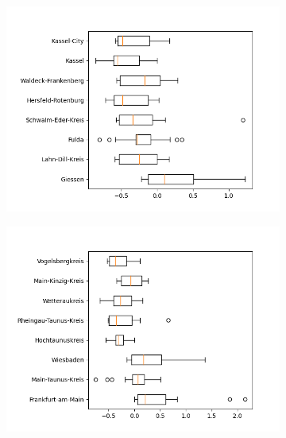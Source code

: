 \begin{figure}
	\centering
	\begin{subfigure}[b]{0.4\textwidth}
		\centering
		\includegraphics[width=\textwidth]{./figures/76d/deviation_box76_alt1.png}	
	\end{subfigure}
	\begin{subfigure}[b]{0.4\textwidth}
		\centering
		\includegraphics[width=\textwidth]{./figures/76d/deviation_box76_alt2.png}	
	\end{subfigure}
	\begin{subfigure}[b]{0.4\textwidth}
		\centering

\end{subfigure}
\end{figure}
